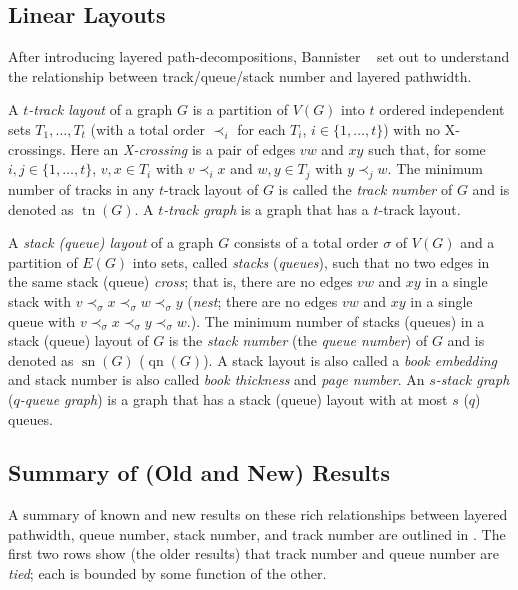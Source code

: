 \documentclass{patmorin}
\DeclareMathOperator{\sn}{sn}
\DeclareMathOperator{\qn}{qn}
\DeclareMathOperator{\tr}{tn}
\begin{document}
\subsection{Linear Layouts}

After introducing layered path-decompositions, Bannister \etal\ \cite{DBLP:conf/gd/BannisterDDEW16,bannister2018track} set
out to understand the relationship between track/queue/stack number and
layered pathwidth.

A \emph{$t$-track layout} of a graph
$G$ is a partition of $V(G)$ into $t$ ordered independent sets $T_1,\ldots,T_t$ (with a total order $\prec_i$ for each $T_i$, $i\in\{1,\ldots,t\}$) with no X-crossings. Here an \emph{X-crossing} is a pair of edges $vw$ and $xy$ such that, for some $i,j\in\{1,\ldots,t\}$, $v,x\in T_i$ with $v\prec_i x$ and $w,y\in T_j$ with $y\prec_j w$. The minimum number of tracks in any $t$-track layout of $G$ is called the \emph{track number} of $G$ and is denoted as $\tr(G)$. A \emph{$t$-track graph} is a graph that has a $t$-track layout.

A \emph{stack (queue) layout} of a graph $G$ consists of a total order
$\sigma$ of $V(G)$ and a partition of $E(G)$ into  sets, called
\emph{stacks} (\emph{queues}), such that no two edges in the same
stack (queue) \emph{cross}; that is, there are no edges
$vw$ and $xy$ in a single stack with $v\prec_\sigma x\prec_\sigma w\prec_\sigma y$
(\emph{nest}; there are no edges $vw$ and $xy$ in a single queue with $v\prec_\sigma
x\prec_\sigma y\prec_\sigma w$.).  The minimum number of stacks (queues) in a
stack (queue) layout of $G$ is the \emph{stack number} (the
\emph{queue number}) of $G$ and is denoted as $\sn(G)$ ($\qn(G)$). A stack layout is also called a {\em book embedding} and stack number is also called {\em book thickness} and {\em page number}. An \emph{$s$-stack graph} (\emph{$q$-queue graph}) is a graph that has a stack (queue) layout with at most $s$ ($q$) queues.

\subsection{Summary of (Old and New) Results}
A summary of known and new results on these rich relationships between layered pathwidth, queue number, stack number, and track number are outlined in .  The first two rows show (the older results) that track number and queue number are \emph{tied}; each is bounded by some function of the other.
\end{document}
